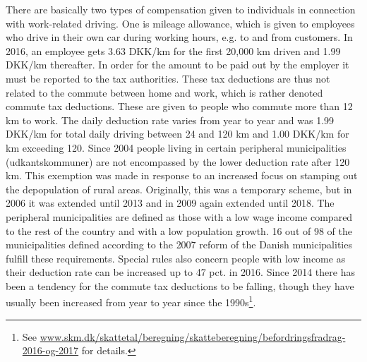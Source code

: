 There are basically two types of compensation given to individuals in connection with work-related driving. One is mileage allowance, which is given to employees who drive in their own car during working hours, e.g. to and from customers. In 2016, an employee gets 3.63 DKK/km for the first 20,000 km driven and 1.99 DKK/km thereafter. In order for the amount to be paid out by the employer it must be reported to the tax authorities. These tax deductions are thus not related to the commute between home and work, which is rather denoted commute tax deductions. These are given to people who commute more than 12 km to work. The daily deduction rate varies from year to year and was 1.99 DKK/km for total daily driving between 24 and 120 km and 1.00 DKK/km for km exceeding 120. Since 2004 people living in certain peripheral municipalities (udkantskommuner) are not encompassed by the lower deduction rate after 120 km. This exemption was made in response to an increased focus on stamping out the depopulation of rural areas. Originally, this was a temporary scheme, but in 2006 it was extended until 2013 and in 2009 again extended until 2018. The peripheral municipalities are defined as those with a low wage income compared to the rest of the country and with a low population growth. 16 out of 98 of the municipalities defined according to the 2007 reform of the Danish municipalities fulfill these requirements. Special rules also concern people with low income as their deduction rate can be increased up to 47 pct. in 2016. Since 2014 there has been a tendency for the commute tax deductions to be falling, though they have usually been increased from year to year since the 1990s\footnote{See \url{www.skm.dk/skattetal/beregning/skatteberegning/befordringsfradrag-2016-og-2017}  for details.}.   

